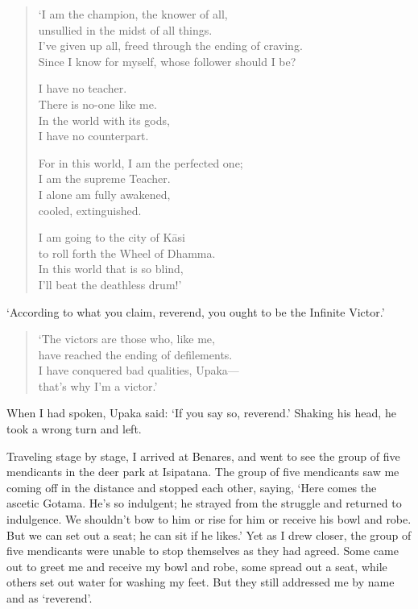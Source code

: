\documentclass[12pt,openany]{book}%
\begin{document}
\begin{verse}%
‘I am the champion, the knower of all, \\
unsullied in the midst of all things. \\
I’ve given up all, freed through the ending of craving. \\
Since I know for myself, whose follower should I be? 

I have no teacher. \\
There is no-one like me. \\
In the world with its gods, \\
I have no counterpart. 

For in this world, I am the perfected one; \\
I am the supreme Teacher. \\
I alone am fully awakened, \\
cooled, extinguished. 

I am going to the city of \textsanskrit{Kāsi} \\
to roll forth the Wheel of Dhamma. \\
In this world that is so blind, \\
I’ll beat the deathless drum!’ 

%
\end{verse}

‘According to what you claim, reverend, you ought to be the Infinite Victor.’ 

\begin{verse}%
‘The victors are those who, like me, \\
have reached the ending of defilements. \\
I have conquered bad qualities, Upaka—\\
that’s why I’m a victor.’ 

%
\end{verse}

When I had spoken, Upaka said: ‘If you say so, reverend.’ Shaking his head, he took a wrong turn and left. 

Traveling stage by stage, I arrived at Benares, and went to see the group of five mendicants in the deer park at Isipatana. The group of five mendicants saw me coming off in the distance and stopped each other, saying, ‘Here comes the ascetic Gotama. He’s so indulgent; he strayed from the struggle and returned to indulgence. We shouldn’t bow to him or rise for him or receive his bowl and robe. But we can set out a seat; he can sit if he likes.’ Yet as I drew closer, the group of five mendicants were unable to stop themselves as they had agreed. Some came out to greet me and receive my bowl and robe, some spread out a seat, while others set out water for washing my feet. But they still addressed me by name and as ‘reverend’. 
\end{document}
